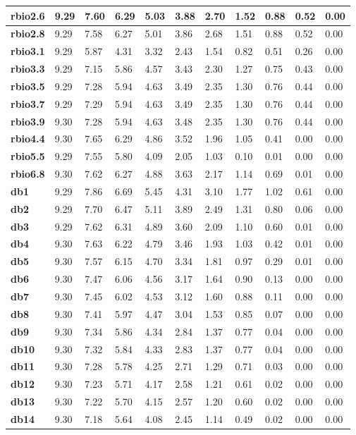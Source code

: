 \begin{tiny}
\begin{longtable}{|l|l|l|l|l|l|l|l|l|l|l|}
\textbf{rbio2.6}&9.29&7.60&6.29&5.03&3.88&2.70&1.52&0.88&0.52&0.00\\\hline
\textbf{rbio2.8}&9.29&7.58&6.27&5.01&3.86&2.68&1.51&0.88&0.52&0.00\\\hline
\textbf{rbio3.1}&9.29&5.87&4.31&3.32&2.43&1.54&0.82&0.51&0.26&0.00\\\hline
\textbf{rbio3.3}&9.29&7.15&5.86&4.57&3.43&2.30&1.27&0.75&0.43&0.00\\\hline
\textbf{rbio3.5}&9.29&7.28&5.94&4.63&3.49&2.35&1.30&0.76&0.44&0.00\\\hline
\textbf{rbio3.7}&9.29&7.29&5.94&4.63&3.49&2.35&1.30&0.76&0.44&0.00\\\hline
\textbf{rbio3.9}&9.30&7.28&5.94&4.63&3.48&2.35&1.30&0.76&0.44&0.00\\\hline
\textbf{rbio4.4}&9.30&7.65&6.29&4.86&3.52&1.96&1.05&0.41&0.00&0.00\\\hline
\textbf{rbio5.5}&9.29&7.55&5.80&4.09&2.05&1.03&0.10&0.01&0.00&0.00\\\hline
\textbf{rbio6.8}&9.30&7.62&6.27&4.88&3.63&2.17&1.14&0.69&0.01&0.00\\\hline
\textbf{db1}&9.29&7.86&6.69&5.45&4.31&3.10&1.77&1.02&0.61&0.00\\\hline
\textbf{db2}&9.29&7.70&6.47&5.11&3.89&2.49&1.31&0.80&0.06&0.00\\\hline
\textbf{db3}&9.29&7.62&6.31&4.89&3.60&2.09&1.10&0.60&0.01&0.00\\\hline
\textbf{db4}&9.30&7.63&6.22&4.79&3.46&1.93&1.03&0.42&0.01&0.00\\\hline
\textbf{db5}&9.30&7.57&6.15&4.70&3.34&1.81&0.97&0.29&0.01&0.00\\\hline
\textbf{db6}&9.30&7.47&6.06&4.56&3.17&1.64&0.90&0.13&0.00&0.00\\\hline
\textbf{db7}&9.30&7.45&6.02&4.53&3.12&1.60&0.88&0.11&0.00&0.00\\\hline
\textbf{db8}&9.30&7.41&5.97&4.47&3.04&1.53&0.85&0.07&0.00&0.00\\\hline
\textbf{db9}&9.30&7.34&5.86&4.34&2.84&1.37&0.77&0.04&0.00&0.00\\\hline
\textbf{db10}&9.30&7.32&5.84&4.33&2.83&1.37&0.77&0.04&0.00&0.00\\\hline
\textbf{db11}&9.30&7.28&5.78&4.25&2.71&1.29&0.71&0.03&0.00&0.00\\\hline
\textbf{db12}&9.30&7.23&5.71&4.17&2.58&1.21&0.61&0.02&0.00&0.00\\\hline
\textbf{db13}&9.30&7.22&5.70&4.15&2.57&1.20&0.60&0.02&0.00&0.00\\\hline
\textbf{db14}&9.30&7.18&5.64&4.08&2.45&1.14&0.49&0.02&0.00&0.00\\\hline

\end{longtable}
\end{tiny}
